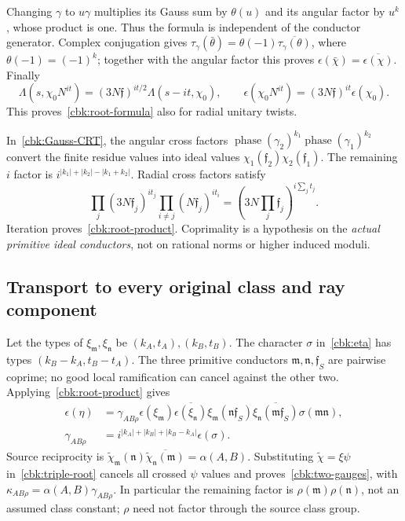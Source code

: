 Changing $\gamma$ to $u\gamma$ multiplies its Gauss sum by $\theta(u)$
and its angular factor by $u^k$, whose product is one. Thus the
formula is independent of the conductor generator. Complex
conjugation gives
$\tau_\gamma(\bar\theta)=\theta(-1)\overline{\tau_\gamma(\theta)}$,
where $\theta(-1)=(-1)^k$; together with the angular factor this
proves $\epsilon(\bar\chi)=\overline{\epsilon(\chi)}$.
Finally
\[
 \Lambda(s,\chi_0N^{it})=(3N\mathfrak f)^{it/2}
                                  \Lambda(s-it,\chi_0),\qquad
 \epsilon(\chi_0N^{it})=(3N\mathfrak f)^{it}\epsilon(\chi_0).
\]
This proves~\eqref{cbk:root-formula} also for radial unitary twists.

In~\eqref{cbk:Gauss-CRT}, the angular cross factors
$\operatorname{phase}(\gamma_2)^{k_1}
 \operatorname{phase}(\gamma_1)^{k_2}$ convert the finite residue
values into ideal values $\chi_1(\mathfrak f_2)\chi_2(\mathfrak f_1)$.
The remaining $i$ factor is
$i^{|k_1|+|k_2|-|k_1+k_2|}$. Radial cross factors satisfy
\[
 \prod_j(3N\mathfrak f_j)^{it_j}
       \prod_{i\ne j}(N\mathfrak f_j)^{it_i}
       =\left(3N\prod_j\mathfrak f_j\right)^{i\sum_jt_j}.
\]
Iteration proves~\eqref{cbk:root-product}. Coprimality is a hypothesis
on the \emph{actual primitive ideal conductors}, not on rational
norms or higher induced moduli.

\subsection{Transport to every original class and ray component}
\label{cbk:root-transport-proof}
Let the types of $\xi_{\mathfrak m},\xi_{\mathfrak n}$ be
$(k_A,t_A),(k_B,t_B)$. The character $\sigma$ in~\eqref{cbk:eta} has
types $(k_B-k_A,t_B-t_A)$. The three primitive conductors
$\mathfrak m,\mathfrak n,\mathfrak f_S$ are pairwise coprime;
no good local ramification can cancel against the other two.
Applying~\eqref{cbk:root-product} gives
\begin{equation}\label{cbk:triple-root}
 \begin{split}
 \epsilon(\eta)
 &=\gamma_{AB\rho}\epsilon(\xi_{\mathfrak m})
       \overline{\epsilon(\xi_{\mathfrak n})}
       \xi_{\mathfrak m}(\mathfrak n\mathfrak f_S)
       \overline{\xi_{\mathfrak n}(\mathfrak m\mathfrak f_S)}
                                  \sigma(\mathfrak m\mathfrak n),\\
 \gamma_{AB\rho}
 &=i^{|k_A|+|k_B|+|k_B-k_A|}\epsilon(\sigma).
 \end{split}
\end{equation}
Source reciprocity is
$\widetilde\chi_{\mathfrak m}(\mathfrak n)
 \overline{\widetilde\chi_{\mathfrak n}(\mathfrak m)}=\alpha(A,B)$.
Substituting $\widetilde\chi=\xi\psi$ in~\eqref{cbk:triple-root}
cancels all crossed $\psi$ values and proves~\eqref{cbk:two-gauges},
with $\kappa_{AB\rho}=\alpha(A,B)\gamma_{AB\rho}$.
In particular the remaining factor is $\rho(\mathfrak m)\rho(\mathfrak n)$,
not an assumed class constant; $\rho$ need not factor through the
source class group.

